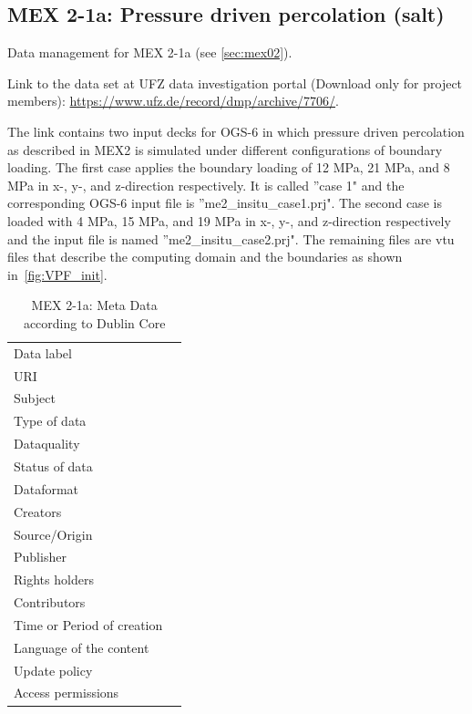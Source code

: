 \subsection{MEX 2-1a: Pressure driven percolation (salt)}

Data management for MEX 2-1a (see \ref{sec:mex02}).

Link to the data set at UFZ data investigation portal (Download only for project members):
\hyperlink{https://www.ufz.de/record/dmp/archive/7706/}{https://www.ufz.de/record/dmp/archive/7706/}.

The link contains two input decks for OGS-6 in which pressure driven percolation as described in MEX2 is simulated under different configurations of boundary loading.
The first case applies the boundary loading of 12 MPa, 21 MPa, and 8 MPa in x-, y-, and z-direction respectively. It is called ''case 1" and the corresponding OGS-6 input file is ''me2\_insitu\_case1.prj".
The second case is loaded with 4 MPa, 15 MPa, and 19 MPa in x-, y-, and z-direction respectively and the input file is named ''me2\_insitu\_case2.prj".
The remaining files are vtu files that describe the computing domain and the boundaries as shown in~\ref{fig:VPF_init}.

\begin{table}[!ht]
\caption{MEX 2-1a: Meta Data according to Dublin Core}
\label{tab:dms-mex2-1a}
\small
\begin{tabular}{R{3cm}|L{7cm}}
\hline
%
Data label &  \\
URI &  \\
Subject  &  \\
Type of data  &  \\
Dataquality  &  \\
Status of data  &  \\
Dataformat  & \\
Creators  &  \\
Source/Origin &  \\
Publisher  &  \\
Rights holders &  \\
Contributors &  \\
Time or Period of creation &  \\
Language of the content &  \\
Update policy &  \\
Access permissions &  \\
%
\hline
\end{tabular}
\end{table}

